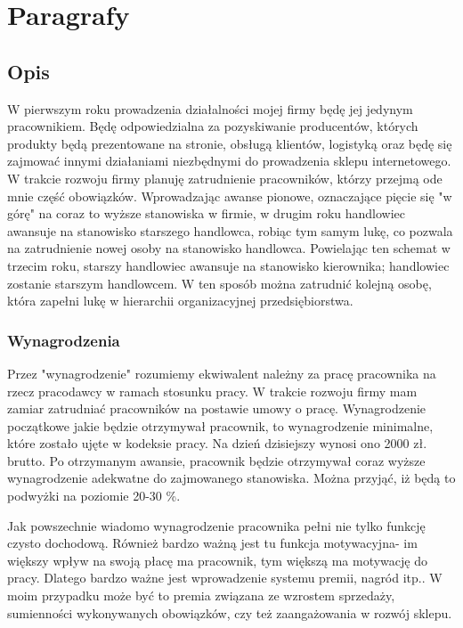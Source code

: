 \section{Paragrafy}

    \subsection{Opis}
        \par W pierwszym roku prowadzenia działalności mojej firmy będę jej jedynym pracownikiem. Będę odpowiedzialna za pozyskiwanie producentów, których produkty będą prezentowane na stronie, obsługą klientów, logistyką oraz będę się zajmować innymi działaniami niezbędnymi do prowadzenia sklepu internetowego. W trakcie rozwoju firmy planuję zatrudnienie pracowników, którzy przejmą ode mnie część obowiązków. Wprowadzając awanse pionowe, oznaczające pięcie się "w górę" na coraz to wyższe stanowiska w firmie, w drugim roku handlowiec awansuje na stanowisko starszego handlowca, robiąc tym samym lukę, co pozwala na zatrudnienie nowej osoby na stanowisko handlowca. Powielając ten schemat w trzecim roku, starszy handlowiec awansuje na stanowisko kierownika; handlowiec zostanie starszym handlowcem. W ten sposób można zatrudnić kolejną osobę, która zapełni lukę w hierarchii organizacyjnej przedsiębiorstwa. 
			 

				
    \subsubsection{Wynagrodzenia}
        \par Przez "wynagrodzenie" rozumiemy ekwiwalent należny za pracę pracownika na rzecz pracodawcy w ramach stosunku pracy. W trakcie rozwoju firmy mam zamiar zatrudniać pracowników na postawie umowy o pracę. Wynagrodzenie początkowe jakie będzie otrzymywał pracownik, to wynagrodzenie minimalne, które zostało ujęte w kodeksie pracy. Na dzień dzisiejszy wynosi ono 2000 zł. brutto. Po otrzymanym awansie, pracownik będzie otrzymywał coraz wyższe wynagrodzenie adekwatne do zajmowanego stanowiska. Można przyjąć, iż będą to podwyżki na poziomie 20-30 \%.
			
        \par Jak powszechnie wiadomo wynagrodzenie pracownika pełni nie tylko funkcję czysto dochodową. Również bardzo ważną jest tu funkcja motywacyjna- im większy wpływ na swoją płacę ma pracownik, tym większą ma motywację do pracy. Dlatego bardzo ważne jest wprowadzenie systemu premii, nagród itp.. W moim przypadku może być to premia związana ze wzrostem sprzedaży, sumienności wykonywanych obowiązków, czy też zaangażowania w rozwój sklepu.
